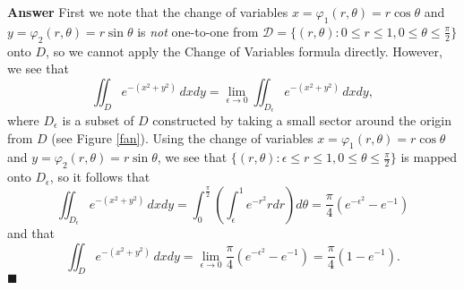\documentclass[12pt,letterpaper]{book}
\numberwithin{equation}{section}
\theoremstyle{definition}
\newenvironment{answer}{\noindent\textbf{Answer}}{\hfill$\blacksquare$\vspace{0.1in}}
\begin{document}
\begin{answer} First we note that the change of variables $x=\varphi_1(r,\theta)=r\cos\theta$ and $y=\varphi_2(r,\theta)=r\sin\theta$ is \textit{not} one-to-one from $\mathscr{D}=\{(r,\theta): 0\leq r\leq 1, 0\leq \theta \leq \frac{\pi}{2}\}$ onto $D$, so we cannot apply the Change of Variables formula directly. However, we see that
$$\iint_D e^{-(x^2+y^2)}\,dxdy=\lim_{\epsilon\to 0}\iint_{D_\epsilon} e^{-(x^2+y^2)}\,dxdy,$$
where $D_\epsilon$ is a subset of $D$ constructed by taking a small sector around the origin from $D$ (see Figure \ref{fan}). Using the change of variables $x=\varphi_1(r,\theta)=r\cos\theta$ and $y=\varphi_2(r,\theta)=r\sin\theta$, we see that $\{(r,\theta):\epsilon \leq r \leq 1, 0\leq \theta \leq \frac{\pi}{2}\}$ is mapped onto $D_\epsilon$, so it follows that
$$\iint_{D_\epsilon} e^{-(x^2+y^2)}\,dxdy=\int_0^\frac{\pi}{2} \left(\int_\epsilon^1  e^{-r^2}rdr\right)d\theta=\frac{\pi}{4}\left(e^{-\epsilon^2}-e^{-1}\right)$$
and that $$\iint_D e^{-(x^2+y^2)}\,dxdy=\lim_{\epsilon\to 0}\frac{\pi}{4}\left(e^{-\epsilon^2}-e^{-1}\right)=\frac{\pi}{4}\left(1-e^{-1}\right).$$
\end{answer}
\end{document}
